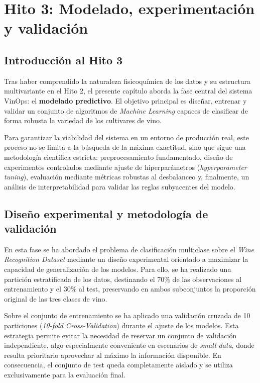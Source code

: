 
\chapter{Hito 3: Modelado, experimentación y validación}

\section{Introducción al Hito 3}

Tras haber comprendido la naturaleza fisicoquímica de los datos y su estructura multivariante en el Hito 2, el presente capítulo aborda la fase central del sistema VinOps: el \textbf{modelado predictivo}. El objetivo principal es diseñar, entrenar y validar un conjunto de algoritmos de \textit{Machine Learning} capaces de clasificar de forma robusta la variedad de los cultivares de vino.

Para garantizar la viabilidad del sistema en un entorno de producción real, este proceso no se limita a la búsqueda de la máxima exactitud, sino que sigue una metodología científica estricta: preprocesamiento fundamentado, diseño de experimentos controlados mediante ajuste de hiperparámetros (\textit{hyperparameter tuning}), evaluación mediante métricas robustas al desbalanceo y, finalmente, un análisis de interpretabilidad para validar las reglas subyacentes del modelo.

\section{Diseño experimental y metodología de validación}

En esta fase se ha abordado el problema de clasificación multiclase sobre el \textit{Wine Recognition Dataset} mediante un diseño experimental orientado a maximizar la capacidad de generalización de los modelos. Para ello, se ha realizado una partición estratificada de los datos, destinando el 70\% de las observaciones al entrenamiento y el 30\% al test, preservando en ambos subconjuntos la proporción original de las tres clases de vino.

Sobre el conjunto de entrenamiento se ha aplicado una validación cruzada de 10 particiones (\textit{10-fold Cross-Validation}) durante el ajuste de los modelos. Esta estrategia permite evitar la necesidad de reservar un conjunto de validación independiente, algo especialmente conveniente en escenarios de \textit{small data}, donde resulta prioritario aprovechar al máximo la información disponible. En consecuencia, el conjunto de test queda completamente aislado y se utiliza exclusivamente para la evaluación final.

